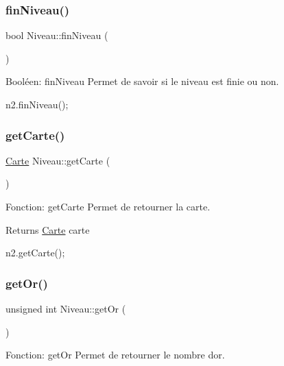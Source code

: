 \subsubsection{\texorpdfstring{fin\+Niveau()}{finNiveau()}}
{\footnotesize\ttfamily bool Niveau\+::fin\+Niveau (\begin{DoxyParamCaption}{ }\end{DoxyParamCaption})}



Booléen\+: fin\+Niveau Permet de savoir si le niveau est finie ou non. 


\begin{DoxyCode}
n2.finNiveau();
\end{DoxyCode}
 \mbox{\label{classNiveau_a503e0b7db795e1f9bf3ea76cc4fd9e99}} 
\subsubsection{\texorpdfstring{get\+Carte()}{getCarte()}}
{\footnotesize\ttfamily \hyperlink{classCarte}{Carte} Niveau\+::get\+Carte (\begin{DoxyParamCaption}{ }\end{DoxyParamCaption})}



Fonction\+: get\+Carte Permet de retourner la carte. 

\begin{DoxyReturn}{Returns}
\hyperlink{classCarte}{Carte} carte 
\begin{DoxyCode}
n2.getCarte();
\end{DoxyCode}
 
\end{DoxyReturn}
\mbox{\label{classNiveau_a86202965dadd70b9f13c4e5e78a46542}} 
\subsubsection{\texorpdfstring{get\+Or()}{getOr()}}
{\footnotesize\ttfamily unsigned int Niveau\+::get\+Or (\begin{DoxyParamCaption}{ }\end{DoxyParamCaption})}



Fonction\+: get\+Or Permet de retourner le nombre d\textquotesingle{}or. 

